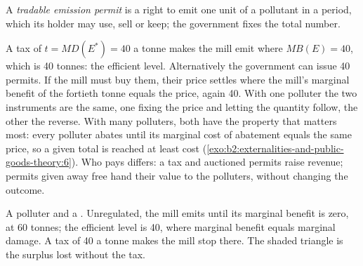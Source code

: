 \begin{definition}\label{def:b2:externalities-and-public-goods-theory:permit}
A \emph{tradable emission permit} is a right to emit one unit of a pollutant in a period,
which its holder may use, sell or keep; the government fixes the total number.
\end{definition}

A tax of $t = \mathit{MD}(E^*) = 40$ a tonne makes the mill emit where $\mathit{MB}(E) = 40$, which is 40 tonnes: the efficient level. Alternatively the
government can issue 40 permits. If the mill must buy them, their price settles where the mill's marginal benefit of
the fortieth tonne equals the price, again 40. With one polluter the two instruments are the same, one fixing the price and
letting the quantity follow, the other the reverse. With many polluters, both have the property that matters most: every
polluter abates until its marginal cost of abatement equals the same price, so a given total is reached at least cost
(\cref{exo:b2:externalities-and-public-goods-theory:6}). Who pays differs: a tax and auctioned permits raise revenue; permits
given away free hand their value to the polluters, without changing the outcome.

\begin{omfigure}

{\small A polluter and a . Unregulated, the mill emits until its marginal benefit is zero, at 60 tonnes; the
efficient level is 40, where marginal benefit equals marginal damage. A tax of 40 a tonne makes the mill stop there. The
shaded triangle is the surplus lost without the tax.}
\end{omfigure}

